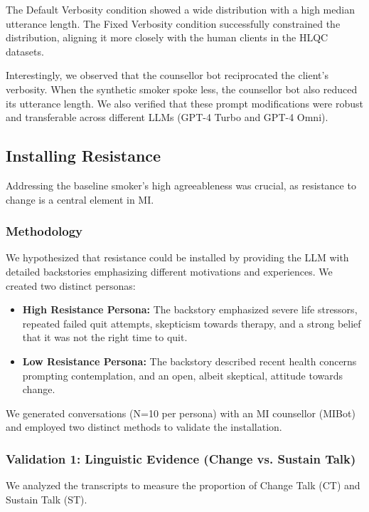 The Default Verbosity condition showed a wide distribution with a high median utterance length. The Fixed Verbosity condition successfully constrained the distribution, aligning it more closely with the human clients in the HLQC datasets.

Interestingly, we observed that the counsellor bot reciprocated the client's verbosity. When the synthetic smoker spoke less, the counsellor bot also reduced its utterance length. We also verified that these prompt modifications were robust and transferable across different LLMs (GPT-4 Turbo and GPT-4 Omni).

\subsection{Installing Resistance}
\label{sec:synthetic-smoker-resistance}

Addressing the baseline smoker's high agreeableness was crucial, as resistance to change is a central element in MI.

\subsubsection{Methodology}
We hypothesized that resistance could be installed by providing the LLM with detailed backstories emphasizing different motivations and experiences. We created two distinct personas:

\begin{itemize}
    \item \textbf{High Resistance Persona:} The backstory emphasized severe life stressors, repeated failed quit attempts, skepticism towards therapy, and a strong belief that it was not the right time to quit.
    \item \textbf{Low Resistance Persona:} The backstory described recent health concerns prompting contemplation, and an open, albeit skeptical, attitude towards change.
\end{itemize}

We generated conversations (N=10 per persona) with an MI counsellor (MIBot) and employed two distinct methods to validate the installation.

\subsubsection{Validation 1: Linguistic Evidence (Change vs. Sustain Talk)}

We analyzed the transcripts to measure the proportion of Change Talk (CT) and Sustain Talk (ST).

